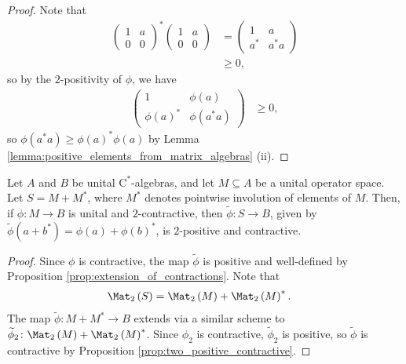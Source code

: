 \begin{proof}
  Note that
  \begin{align*}
    \begin{pmatrix}1 & a \\ 0 & 0\end{pmatrix}^{\ast} \begin{pmatrix}1 & a \\ 0 & 0\end{pmatrix} &= \begin{pmatrix}1 & a \\ a^{\ast} & a^{\ast}a\end{pmatrix}\\
                     &\geq 0,
  \end{align*}
  so by the $2$-positivity of $\phi$, we have
  \begin{align*}
    \begin{pmatrix}1 & \phi\left( a \right) \\ \phi\left( a \right)^{\ast} & \phi\left( a^{\ast}a \right)\end{pmatrix} &\geq 0,
  \end{align*}
  so $\phi\left( a^{\ast}a \right) \geq \phi\left( a \right)^{\ast}\phi\left( a \right)$ by Lemma \ref{lemma:positive_elements_from_matrix_algebras} (ii).
\end{proof}
\begin{proposition}
  Let $A$ and $B$ be unital $\mathrm{C}^{\ast}$-algebras, and let $M\subseteq A$ be a unital operator space. Let $S = M + M^{\ast}$, where $M^{\ast}$ denotes pointwise involution of elements of $M$. Then, if $\phi\colon M\rightarrow B$ is unital and $2$-contractive, then $\widetilde{\phi}\colon S\rightarrow B$, given by $\widetilde{\phi}\left( a + b^{\ast} \right) = \phi\left( a \right) + \phi\left( b \right)^{\ast}$, is $2$-positive and contractive.
\end{proposition}
\begin{proof}
  Since $\phi$ is contractive, the map $\widetilde{\phi}$ is positive and well-defined by Proposition \ref{prop:extension_of_contractions}. Note that
  \begin{align*}
    \Mat_2\left( S \right) &= \Mat_2\left( M \right) + \Mat_2\left( M \right)^{\ast}.
  \end{align*}
  The map $\widetilde{\phi}\colon M + M^{\ast}\rightarrow B$ extends via a similar scheme to $\widetilde{\phi}_2\colon \Mat_2\left( M \right) + \Mat_2\left( M \right)^{\ast}$. Since $\phi_2$ is contractive, $\widetilde{\phi}_2$ is positive, so $\widetilde{\phi}$ is contractive by Proposition \ref{prop:two_positive_contractive}.
\end{proof}
